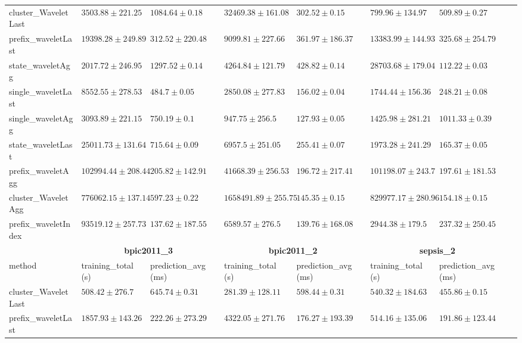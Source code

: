 \begin{table}[!htbp]
{\begin{tabular}{llllllll}
			cluster\_WaveletLast & $3503.88 \pm 221.25$ & $1084.64 \pm 0.18$ & $32469.38 \pm 161.08$ & $302.52 \pm 0.15$ & $\mathbf{799.96 \pm 134.97}$ & $509.89 \pm 0.27$ \\ 
			prefix\_waveletLast & $19398.28 \pm 249.89$ & $312.52 \pm 220.48$ & $9099.81 \pm 227.66$ & $361.97 \pm 186.37$ & $13383.99 \pm 144.93$ & $325.68 \pm 254.79$ \\ 
			state\_waveletAgg & $\mathbf{2017.72 \pm 246.95}$ & $1297.52 \pm 0.14$ & $4264.84 \pm 121.79$ & $428.82 \pm 0.14$ & $28703.68 \pm 179.04$ & $\mathbf{112.22 \pm 0.03}$ \\ 
			single\_waveletLast & $8552.55 \pm 278.53$ & $484.7 \pm 0.05$ & $2850.08 \pm 277.83$ & $156.02 \pm 0.04$ & $1744.44 \pm 156.36$ & $248.21 \pm 0.08$ \\ 
			single\_waveletAgg & $3093.89 \pm 221.15$ & $750.19 \pm 0.1$ & $\mathbf{947.75 \pm 256.5}$ & $\mathbf{127.93 \pm 0.05}$ & $1425.98 \pm 281.21$ & $1011.33 \pm 0.39$ \\ 
			state\_waveletLast & $25011.73 \pm 131.64$ & $715.64 \pm 0.09$ & $6957.5 \pm 251.05$ & $255.41 \pm 0.07$ & $1973.28 \pm 241.29$ & $165.37 \pm 0.05$ \\ 
			prefix\_waveletAgg & $102994.44 \pm 208.44$ & $205.82 \pm 142.91$ & $41668.39 \pm 256.53$ & $196.72 \pm 217.41$ & $101198.07 \pm 243.7$ & $197.61 \pm 181.53$ \\ 
			cluster\_WaveletAgg & $776062.15 \pm 137.14$ & $597.23 \pm 0.22$ & $1658491.89 \pm 255.75$ & $145.35 \pm 0.15$ & $829977.17 \pm 280.96$ & $154.18 \pm 0.15$ \\ 
			prefix\_waveletIndex & $93519.12 \pm 257.73$ & $\mathbf{137.62 \pm 187.55}$ & $6589.57 \pm 276.5$ & $139.76 \pm 168.08$ & $2944.38 \pm 179.5$ & $237.32 \pm 250.45$ \\ 
			\bottomrule
			\toprule
			& \multicolumn{2}{c}{{\bfseries bpic2011\_3}} & \multicolumn{2}{c}{{\bfseries bpic2011\_2}} & \multicolumn{2}{c}{{\bfseries sepsis\_2}} \\ \cmidrule(lr){2-3} \cmidrule(lr){4-5} \cmidrule(lr){6-7}
			method  & training\_total (s) & prediction\_avg (ms) & training\_total (s) & prediction\_avg (ms) & training\_total (s) & prediction\_avg (ms) \\ \midrule
			cluster\_WaveletLast & $\mathbf{508.42 \pm 276.7}$ & $645.74 \pm 0.31$ & $\mathbf{281.39 \pm 128.11}$ & $598.44 \pm 0.31$ & $540.32 \pm 184.63$ & $455.86 \pm 0.15$ \\ 
			prefix\_waveletLast & $1857.93 \pm 143.26$ & $222.26 \pm 273.29$ & $4322.05 \pm 271.76$ & $176.27 \pm 193.39$ & $514.16 \pm 135.06$ & $191.86 \pm 123.44$ \\ 

\end{tabular}}
\end{table}

